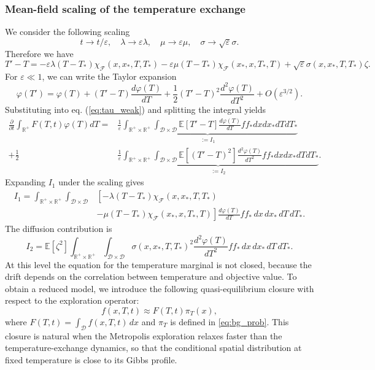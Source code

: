 \documentclass[10pt,a4paper]{article}
\theoremstyle{theorem}
\numberwithin{equation}{section}
\begin{document}
\subsubsection{Mean-field scaling of the temperature exchange}
We consider the following scaling
\begin{equation*}
t\rightarrow t/\varepsilon,\quad \lambda\rightarrow \varepsilon \lambda,\quad \mu\rightarrow \varepsilon \mu, \quad \sigma \rightarrow \sqrt{\varepsilon} \sigma.
\end{equation*}
Therefore we have
\[
T'-T
=
-\varepsilon\lambda(T-T_*)\chi_\mathcal{F}(x,x_*,T,T_*)
-\varepsilon\mu(T-T_*)\chi_\mathcal{F}(x_*,x,T_*,T)
+\sqrt{\varepsilon}\sigma(x,x_*,T,T_*)\zeta.
\]
For $\varepsilon \ll 1$, we can write the Taylor expansion
\begin{equation}
\varphi(T')=\varphi(T)+(T'-T)\frac{d\varphi(T)}{dT}+\frac{1}{2}(T'-T)^2\frac{d^2\varphi(T)}{dT^2}+O\left(\varepsilon^{3/2}\right).
\end{equation} 
Substituting into eq. (\ref{eq:tau_weak}) and splitting the integral yields
\begin{align}
\frac{\partial}{\partial t}\int_{\mathbb{R}^+} F(T,t)\varphi(T)dT= &\underbrace{\frac1{\varepsilon}\int_{\mathbb{R}^+\times\mathbb{R}^+}\int_{\mathcal D\times\mathcal D}\mathbb{E}\left[T'-T\right]\frac{d\varphi(T)}{dT}ff_*dxdx_*dTdT_*}_{:=I_1} \\
+\frac{1}{2}&\underbrace{\frac1{\varepsilon}\int_{\mathbb{R}^+\times\mathbb{R}^+}\int_{\mathcal D\times\mathcal D}\mathbb{E}\left[(T'-T)^2\right]\frac{d^2\varphi(T)}{dT^2} ff_*dxdx_* dTdT_*}_{:=I_2}.
\end{align}
Expanding \(I_1\) under the scaling gives
\begin{equation}
\begin{split}
I_1
=
\int_{\mathbb R^+\times\mathbb R^+}
\int_{\mathcal D\times\mathcal D}
&\left[
-\lambda(T-T_*)\chi_\mathcal F(x,x_*,T,T_*)
\right.\\
&\left.
-\mu(T-T_*)\chi_\mathcal F(x_*,x,T_*,T)
\right]
\frac{d\varphi(T)}{dT}
ff_*\,dx\,dx_*\,dT\,dT_* .
\end{split}
\end{equation}
The diffusion contribution is
\begin{equation}
I_2
=
\mathbb E[\zeta^2]
\int_{\mathbb R^+\times\mathbb R^+}
\int_{\mathcal D\times\mathcal D}
\sigma(x,x_*,T,T_*)^2
\frac{d^2\varphi(T)}{dT^2}
ff_*\,dx\,dx_*\,dT\,dT_* .
\end{equation}
At this level the equation for the temperature marginal is not closed, because
the drift depends on the correlation between temperature and objective value. To
obtain a reduced model, we introduce the following quasi-equilibrium closure with
respect to the exploration operator:
\begin{equation}
\label{eq:closure_gibbs}
f(x,T,t)\approx F(T,t)\pi_T(x),
\end{equation}
where \(F(T,t)=\int_{\mathcal D}f(x,T,t)\,dx\) and \(\pi_T\) is defined in
\eqref{eq:bg_prob}. This closure is natural when the Metropolis exploration
relaxes faster than the temperature-exchange dynamics, so that the conditional
spatial distribution at fixed temperature is close to its Gibbs profile.
\end{document}
